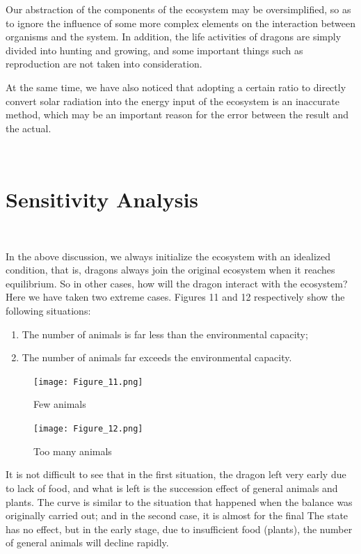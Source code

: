 \documentclass{mcmthesis}
\begin{document}
Our abstraction of the components of the ecosystem may be oversimplified, so as to ignore the influence of some more complex elements on the interaction between organisms and the system. In addition, the life activities of dragons are simply divided into hunting and growing, and some important things such as reproduction are not taken into consideration.

At the same time, we have also noticed that adopting a certain ratio to directly convert solar radiation into the energy input of the ecosystem is an inaccurate method, which may be an important reason for the error between the result and the actual.

~\ \
\section{Sensitivity Analysis}
~\ \

In the above discussion, we always initialize the ecosystem with an idealized condition, that is, dragons always join the original ecosystem when it reaches equilibrium. So in other cases, how will the dragon interact with the ecosystem? Here we have taken two extreme cases. Figures 11 and 12 respectively show the following situations: 
\begin{enumerate}
\item The number of animals is far less than the environmental capacity; 
\item The number of animals far exceeds the environmental capacity.
\end{enumerate}

\begin{figure}[h]
    \centering
    \texttt{[image: Figure\_11.png]}
    \caption{Few animals}\label{fig:simulate9}
\end{figure}

\begin{figure}[h]
    \centering
    \texttt{[image: Figure\_12.png]}
    \caption{Too many animals}\label{fig:simulate10}
\end{figure}

It is not difficult to see that in the first situation, the dragon left very early due to lack of food, and what is left is the succession effect of general animals and plants. The curve is similar to the situation that happened when the balance was originally carried out; and in the second case, it is almost for the final The state has no effect, but in the early stage, due to insufficient food (plants), the number of general animals will decline rapidly.
\end{document}
